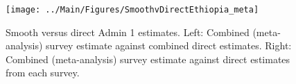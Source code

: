 \documentclass[12pt]{article}\usepackage[]{graphicx}\usepackage[]{color}
\newenvironment{knitrout}{}{} %
\begin{document}



\begin{knitrout}
\color{fgcolor}\begin{figure}[bht]

{\centering \texttt{[image: ../Main/Figures/SmoothvDirectEthiopia\_meta]} 

}

\caption[Smooth versus direct Admin 1 estimates]{Smooth versus direct Admin 1 estimates. Left: Combined (meta-analysis) survey estimate against combined direct estimates. Right: Combined (meta-analysis) survey estimate against direct estimates from each survey.}\label{fig:unnamed-chunk-113}
\end{figure}


\end{knitrout}
\end{document}
